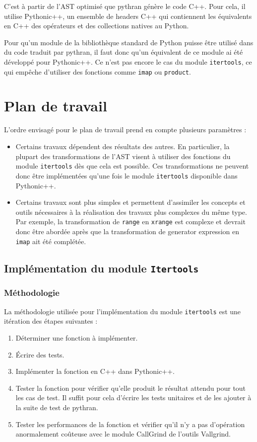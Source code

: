 \documentclass[a4paper]{article}
\begin{document}
C'est à partir de l'AST optimisé que pythran génère le code C++. Pour
cela, il utilise Pythonic++, un ensemble de headers C++ qui
contiennent les équivalents en C++ des opérateurs et des collections
natives au Python.

Pour qu'un module de la bibliothèque standard de Python puisse être
utilisé dans du code traduit par pythran, il faut donc qu'un
équivalent de ce module ai été développé pour Pythonic++. Ce n'est pas
encore le cas du module \texttt{itertools}, ce qui empêche d'utiliser des
fonctions comme \texttt{imap} ou \texttt{product}.

\section{Plan de travail}

L'ordre envisagé pour le plan de travail prend en compte plusieurs
paramètres :

\begin{itemize}
\item Certains travaux dépendent des résultats des autres. En
  particulier, la plupart des transformations de l'AST visent à
  utiliser des fonctions du module \texttt{itertools} dès que cela est
  possible. Ces transformations ne peuvent donc être implémentées
  qu'une fois le module \texttt{itertools} disponible dans Pythonic++.
\item Certains travaux sont plus simples et permettent d'assimiler les
  concepts et outils nécessaires à la réalisation des travaux plus
  complexes du même type. Par exemple, la transformation de
  \texttt{range} en \texttt{xrange} est complexe et devrait donc être
  abordée après que la transformation de generator expression en
  \texttt{imap} ait été complétée.
\end{itemize}

\subsection{Implémentation du module \texttt{Itertools}}

\subsubsection{Méthodologie}

La méthodologie utilisée pour l'implémentation du module
\texttt{itertools} est une itération des étapes suivantes :

\begin{enumerate}
\item Déterminer une fonction à implémenter.
\item Écrire des tests.
\item Implémenter la fonction en C++ dans Pythonic++.
\item Tester la fonction pour vérifier qu'elle produit le résultat
  attendu pour tout les cas de test. Il suffit pour cela d'écrire les
  tests unitaires et de les ajouter à la suite de test de pythran.
  \item Tester les performances de la fonction et vérifier qu'il n'y a
    pas d'opération anormalement coûteuse avec le module CallGrind de
    l'outils Vallgrind.
\end{enumerate}
\end{document}
